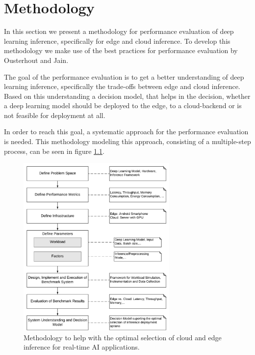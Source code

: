 \chapter{Methodology}
\label{chap:methodology}

In this section we present a methodology for performance evaluation of deep learning inference, specifically for edge and cloud inference.
To develop this methodology we make use of the best practices for performance evaluation by Ousterhout \cite{Ousterhout:2018:AMO:3234519.3213770} and Jain\cite{books/daglib/0076234}.

The goal of the performance evaluation is to get a better understanding of deep learning inference, specifically the trade-offs between edge and cloud inference.
Based on this understanding a decision model, that helps in the decision, whether a deep learning model should be deployed to the edge, to a cloud-backend or is not feasible for deployment at all.

In order to reach this goal, a systematic approach for the performance evaluation is needed.
This methodology modeling this approach, consisting of a multiple-step process, can be seen in figure \ref{fig:Methodology}. 
\begin{figure}[!htb]
\centering
\includegraphics[width=0.7\textwidth]{./Bilder/Methodology.pdf}
\caption{Methodology to help with the optimal selection of cloud and edge inference for real-time AI applications.}
\label{fig:Methodology}
\end{figure}





